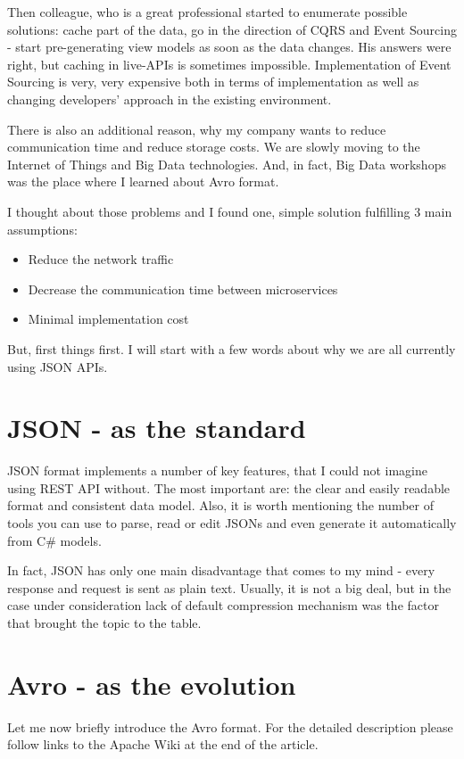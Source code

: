 \documentclass[]{article}
\begin{document}
Then colleague, who is a great professional started to enumerate possible solutions: cache part of the data, go in the direction of CQRS and Event Sourcing - start pre-generating view models as soon as the data changes. His answers were right, but caching in live-APIs is sometimes impossible. Implementation of Event Sourcing is very, very expensive both in terms of implementation as well as changing developers' approach in the existing environment.

There is also an additional reason, why my company wants to reduce communication time and reduce storage costs. We are slowly moving to the Internet of Things and Big Data technologies. And, in fact, Big Data workshops was the place where I learned about Avro format.

I thought about those problems and I found one, simple solution fulfilling 3 main assumptions:
\begin{itemize}
	\item Reduce the network traffic 
	\item Decrease the communication time between microservices 
	\item Minimal implementation cost
\end{itemize}


But, first things first. I will start with a few words about why we are all currently using JSON APIs.


\section{JSON - as the standard}
JSON format implements a number of key features, that I could not imagine using REST API without. The most important are: the clear and easily readable format and consistent data model. Also, it is worth mentioning the number of tools you can use to parse, read or edit JSONs and even generate it automatically from C\# models.

In fact, JSON has only one main disadvantage that comes to my mind - every response and request is sent as plain text. Usually, it is not a big deal, but in the case under consideration lack of default compression mechanism was the factor that brought the topic to the table.


\section{Avro - as the evolution}

Let me now briefly introduce the Avro format. For the detailed description please follow links to the Apache Wiki at the end of the article.
\end{document}
